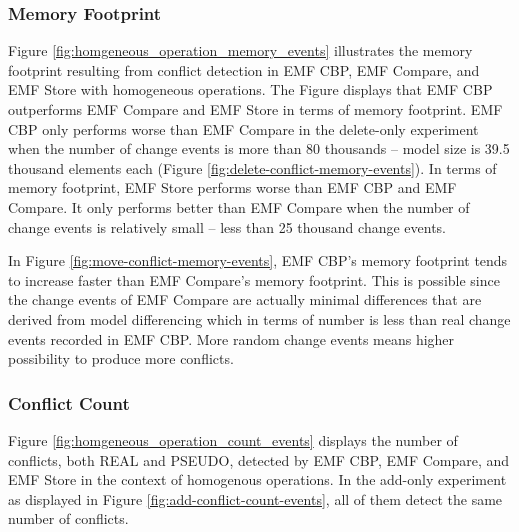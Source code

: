 \subsubsection{Memory Footprint}
\label{sec:memory_footprint}
Figure \ref{fig:homgeneous_operation_memory_events} illustrates the memory footprint resulting from conflict detection in EMF CBP, EMF Compare, and EMF Store with homogeneous operations. The Figure displays that EMF CBP outperforms EMF Compare and EMF Store in terms of memory footprint. EMF CBP only performs worse than EMF Compare in the delete-only experiment when the number of change events is more than 80 thousands -- model size is 39.5 thousand elements each (Figure \ref{fig:delete-conflict-memory-events}). In terms of memory footprint, EMF Store performs worse than EMF CBP and EMF Compare. It only performs better than EMF Compare when the number of change events is relatively small -- less than 25 thousand change events. 



In Figure \ref{fig:move-conflict-memory-events}, EMF CBP's memory footprint tends to increase faster than EMF Compare's memory footprint. This is possible since the change events of EMF Compare are actually minimal differences that are derived from model differencing which in terms of number is less than real change events recorded in EMF CBP. More random change events means higher possibility to produce more conflicts.

\subsubsection{Conflict Count}
\label{sec:conflict_count}
Figure \ref{fig:homgeneous_operation_count_events} displays the number of conflicts, both \textsf{REAL} and \textsf{PSEUDO}, detected by EMF CBP, EMF Compare, and EMF Store in the context of homogenous operations. In the add-only experiment as displayed in Figure \ref{fig:add-conflict-count-events}, all of them detect the same number of conflicts.

